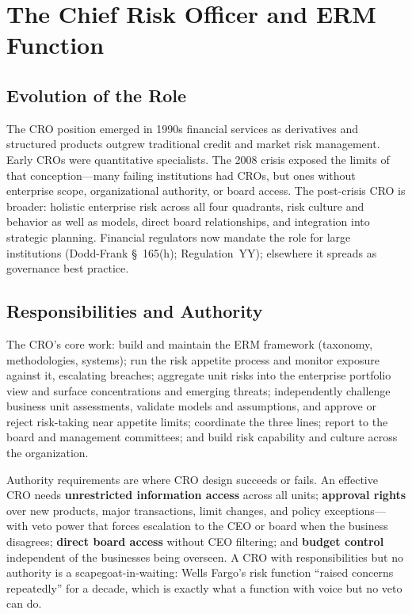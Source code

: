\documentclass[11pt,openany]{book}
\begin{document}
\section{The Chief Risk Officer and ERM Function}
\label{sec:cro}

\subsection{Evolution of the Role}

The CRO position emerged in 1990s financial services as derivatives and
structured products outgrew traditional credit and market risk management.
Early CROs were quantitative specialists. The 2008 crisis exposed the limits
of that conception---many failing institutions had CROs, but ones without
enterprise scope, organizational authority, or board access. The post-crisis
CRO is broader: holistic enterprise risk across all four quadrants, risk
culture and behavior as well as models, direct board relationships, and
integration into strategic planning. Financial regulators now mandate the
role for large institutions (Dodd-Frank \S~165(h); Regulation~YY); elsewhere
it spreads as governance best practice.

\subsection{Responsibilities and Authority}

The CRO's core work: build and maintain the ERM framework (taxonomy,
methodologies, systems); run the risk appetite process and monitor exposure
against it, escalating breaches; aggregate unit risks into the enterprise
portfolio view and surface concentrations and emerging threats; independently
challenge business unit assessments, validate models and assumptions, and
approve or reject risk-taking near appetite limits; coordinate the three
lines; report to the board and management committees; and build risk
capability and culture across the organization.

Authority requirements are where CRO design succeeds or fails. An effective
CRO needs \textbf{unrestricted information access} across all units;
\textbf{approval rights} over new products, major transactions, limit
changes, and policy exceptions---with veto power that forces escalation to
the CEO or board when the business disagrees; \textbf{direct board access}
without CEO filtering; and \textbf{budget control} independent of the
businesses being overseen. A CRO with responsibilities but no authority is a
scapegoat-in-waiting: Wells Fargo's risk function ``raised concerns
repeatedly'' for a decade, which is exactly what a function with voice but no
veto can do.
\end{document}

